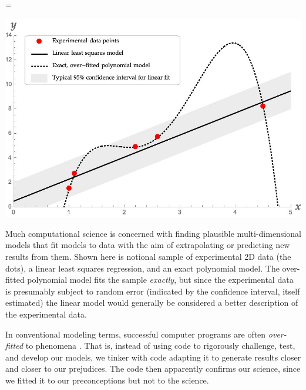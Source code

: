 \documentclass{comjnl}
\begin{document}
\begin{figure\figureStarDetails}[t]
{ \newdimen \imageWidth 
  \imageWidth=\textwidth
  \imageWidthCalculation
  \begin{center}\includegraphics[width=\imageWidth]{
generated/mathematicaplot.jpg
}\end{center}}
\caption{Much computational science is concerned with finding plausible multi-dimensional models that fit models to data with the aim of extrapolating or predicting new results from them. Shown here is notional sample of experimental 2D data (the dots), a linear least squares regression, and an exact polynomial model. The over-fitted polynomial model fits the sample \emph{exactly\/}, but since the experimental data is presumably subject to random error (indicated by the confidence interval, itself estimated) the linear model would generally be considered a better description of the experimental data.}
\label{fig-overfit}
\end{figure\figureStarDetails}

In conventional modeling terms, successful computer programs are often \emph{over-fitted\/} to phenomena \cite{over-fit}. That is, instead of using code to rigorously challenge, test, and develop our models, we tinker with code adapting it to generate results closer and closer to our prejudices. The code then apparently confirms our science, since we fitted it to our preconceptions but not to the science.  
\end{document}
